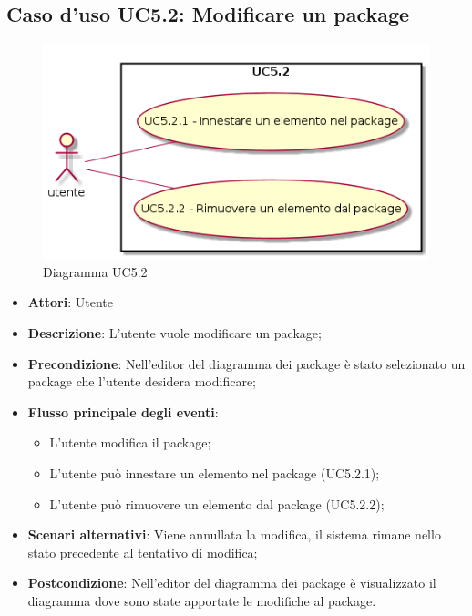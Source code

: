 \documentclass[../AnalisiDeiRequisiti.tex]{subfiles}
\begin{document}
			\subsection{Caso d'uso UC5.2: Modificare un package}
			\begin{figure} [H]
				\centering
				\includegraphics[scale=0.45]{./Figures/UC5_2.png}
				\caption{Diagramma UC5.2}\label{}
			\end{figure}
			\begin{itemize}
				\item \textbf{Attori}: Utente
				\item \textbf{Descrizione}: L'utente vuole modificare un package;
				\item \textbf{Precondizione}: Nell'editor del diagramma dei package è stato selezionato un package che l'utente desidera modificare;
				\item \textbf{Flusso principale degli eventi}: \begin{itemize}
					\item L'utente modifica il package;
					\item L'utente può innestare un elemento nel package (UC5.2.1);
					\item L'utente può rimuovere un elemento dal package (UC5.2.2);
				\end{itemize}
				\item \textbf{Scenari alternativi}: Viene annullata la modifica, il sistema	rimane nello stato precedente al tentativo di modifica;
				\item \textbf{Postcondizione}: Nell'editor del diagramma dei package è visualizzato il diagramma dove sono state apportate le modifiche al package.
			\end{itemize}
\end{document}
